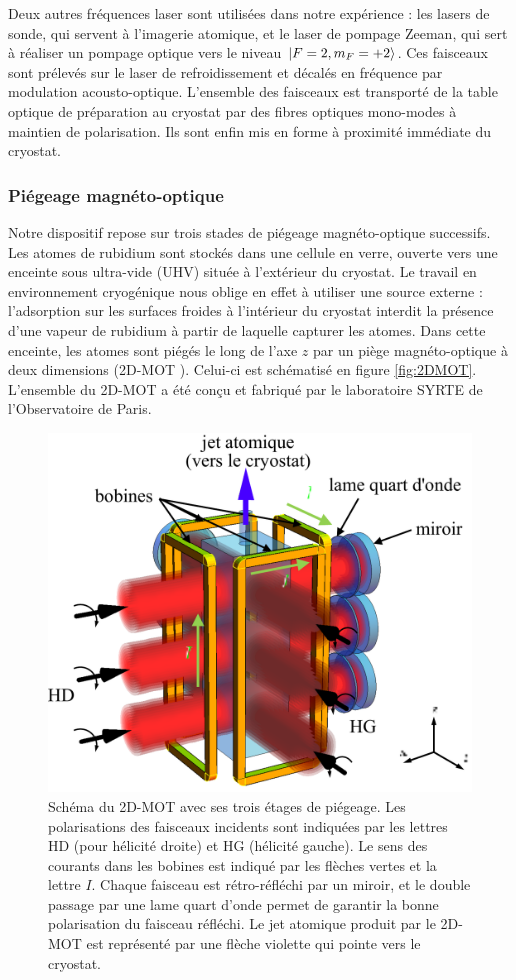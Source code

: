Deux autres fréquences laser sont utilisées dans notre expérience : les lasers de sonde, qui servent à l'imagerie atomique, et le laser de pompage Zeeman, qui sert à réaliser un pompage optique vers le niveau $\ket{F=2,m_F=+2}$.
Ces faisceaux sont prélevés sur le laser de refroidissement et décalés en fréquence par modulation acousto-optique.
L'ensemble des faisceaux est transporté de la table optique de préparation au cryostat par des fibres optiques mono-modes à maintien de polarisation.
Ils sont enfin mis en forme à proximité immédiate du cryostat. 


\subsubsection*{Piégeage magnéto-optique}
\noindent	Notre dispositif repose sur trois stades de piégeage magnéto-optique successifs.
Les atomes de rubidium sont stockés dans une cellule en verre, ouverte vers une enceinte sous ultra-vide (UHV) située à l'extérieur du cryostat.
Le travail en environnement cryogénique nous oblige en effet à utiliser une source externe : l'adsorption sur les surfaces froides à l'intérieur du cryostat interdit la présence d'une vapeur de rubidium à partir de laquelle capturer les atomes.
Dans cette enceinte, les atomes sont piégés le long de l'axe $z$ par un piège magnéto-optique à deux dimensions (\og 2D-MOT \fg{}).
Celui-ci est schématisé en figure \eqref{fig:2DMOT}.
L'ensemble du 2D-MOT a été conçu et fabriqué par le laboratoire SYRTE de l'Observatoire de Paris.
%	
\begin{figure}[h]
\centering
\includegraphics[width=0.6\linewidth]{figures/setup/coldatoms/2DMOT_2}
\caption[Schéma du 2D-MOT]{Schéma du 2D-MOT avec ses trois étages de piégeage.
Les polarisations des faisceaux incidents sont indiquées par les lettres HD (pour hélicité droite) et HG (hélicité gauche).%
Le sens des courants dans les bobines est indiqué par les flèches vertes et la lettre $I$.
Chaque faisceau est rétro-réfléchi par un miroir, et le double passage par une lame quart d'onde permet de garantir la bonne polarisation du faisceau réfléchi.
Le jet atomique produit par le 2D-MOT est représenté par une flèche violette qui pointe vers le cryostat.
}
\label{fig:2DMOT}
\end{figure}
%

